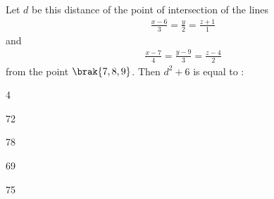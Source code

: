 	\item Let $d$ be this distance of the point of intersection of the lines
        \begin{align}
            \frac{x-6}{3} = \frac{y}{2} = \frac{z+1}{1} 
        \end{align} and 
        \begin{align}
            \frac{x-7}{4} = \frac{y-9}{3} = \frac{z-4}{2}
        \end{align} from the point $\brak{7, 8, 9}$. Then $d^2 + 6$ is equal to :
        \hfill{}
		\begin{enumerate}
		\end{enumerate}

